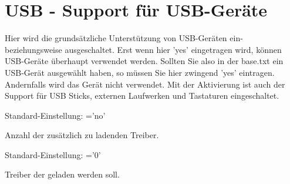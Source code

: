 {
\section {USB - Support für USB-Geräte}
}
\begin{description}


        Hier wird die grundsätzliche Unterstützung von USB-Geräten ein-
        beziehungsweise ausgeschaltet. Erst wenn hier 'yes' eingetragen
        wird, können USB-Geräte überhaupt verwendet werden. Sollten Sie
        also in der base.txt ein USB-Gerät ausgewählt haben, so müssen Sie
        hier zwingend 'yes' eintragen. Andernfalls wird das Gerät nicht
        verwendet. Mit der Aktivierung ist auch der Support für USB Sticks,
        externen Laufwerken und Tastaturen eingeschaltet.

        Standard-Einstellung:  ='no'


        Anzahl der zusätzlich zu ladenden Treiber. 

        Standard-Einstellung: ='0'


        Treiber der geladen werden soll.


\end{description}
